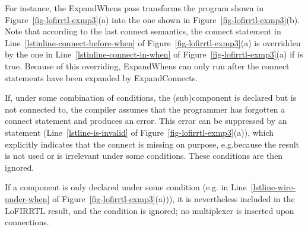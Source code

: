 
For instance, the ExpandWhens pass transforms the program shown in Figure~\ref{fig-lofirrtl-exmp3}(a)
into the one shown in Figure~\ref{fig-lofirrtl-exmp3}(b).
Note that according to the last connect semantics,
the connect statement in Line~\ref{lstinline-connect-before-when} of Figure~\ref{fig-lofirrtl-exmp3}(a)
is overridden by the one in Line~\ref{lstinline-connect-in-when} of Figure~\ref{fig-lofirrtl-exmp3}(a)
if  is true.
Because of this overriding,
ExpandWhens can only run after the connect statements have been expanded by ExpandConnects.

If, under some combination of conditions, the (sub)component is declared but is not connected to,
the compiler assumes that the programmer has forgotten a connect statement
and produces an error.
This error can be suppressed by an  statement
(Line~\ref{lstline-is-invalid} of Figure~\ref{fig-lofirrtl-exmp3}(a)),
which explicitly indicates that the connect is missing on purpose,
e.g.\@ because the result is not used or is irrelevant under some conditions.
These conditions are then ignored.

If a component is only declared under some condition
(e.g.  in Line~\ref{lstline-wire-under-when} of Figure~\ref{fig-lofirrtl-exmp3}(a))),
it is nevertheless included in the LoFIRRTL result,
and the condition is ignored; no multiplexer is inserted upon connections.




